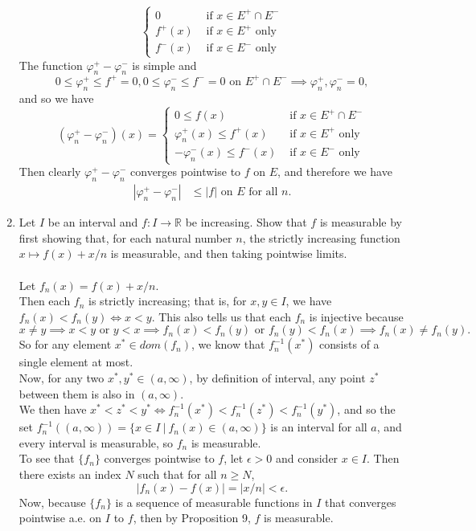 \begin{enumerate}
\[\begin{cases}
            0&\text{ if }x\in E^+\cap E^-\\
            f^+(x)&\text{ if }x\in E^+\text{ only}\\
            f^-(x)&\text{ if }x\in E^-\text{ only}
        \end{cases}    
    \]
    The function $\varphi^+_n-\varphi^-_n$ is simple and
    \[
        0\le\varphi^+_n\le f^+=0, 0\le\varphi^-_n\le f^-=0\text{ on }E^+\cap E^-\implies\varphi^+_n,\varphi^-_n =0,
    \]
    and so we have
    \[
        (\varphi^+_n-\varphi^-_n)(x)=
        \begin{cases}
            0\le f(x)&\text{ if }x\in E^+\cap E^-\\
            \varphi^+_n(x)\le f^+(x)&\text{ if }x\in E^+\text{ only}\\
            -\varphi^-_n(x)\le f^-(x)&\text{ if }x\in E^-\text{ only}
        \end{cases}    
    \]
    Then clearly $\varphi^+_n-\varphi^-_n$ converges pointwise to $f$ on $E$, and therefore we have
    \begin{align*}
        |\varphi^+_n-\varphi^-_n|&\le|f|\text{ on }E\text{ for all }n.
    \end{align*}
    \item Let $I$ be an interval and $f:I\to\mathbb{R}$ be increasing. Show that $f$ is measurable by first showing that, for each natural number $n$, the strictly increasing function $x\mapsto f(x)+x/n$ is measurable, and then taking pointwise limits.\\
    \\Let $f_n(x)=f(x)+x/n$.\\
    Then each $f_n$ is strictly increasing; that is, for $x,y\in I$, we have $f_n(x)<f_n(y)\iff x<y$. 
    This also tells us that each $f_n$ is injective because 
    \[
        x\neq y \implies x<y\text{ or }y<x \implies f_n(x)<f_n(y)\text{ or }f_n(y)<f_n(x)\implies f_n(x)\neq f_n(y).
    \]
    So for any element $x^*\in dom(f_n)$, we know that $f_n^{-1}(x^*)$ consists of a single element at most.
    \\Now, for any two $x^*,y^*\in(a,\infty)$, by definition of interval, any point $z^*$ between them is also in $(a,\infty)$. 
    \\We then have $x^*<z^*<y^* \iff f_n^{-1}(x^*)<f_n^{-1}(z^*)<f_n^{-1}(y^*)$, and so the set $f_n^{-1}((a,\infty))=\{x\in I\ |\ f_n(x)\in(a,\infty)\}$ is an interval for all $a$, and every interval is measurable, so $f_n$ is measurable.
    \\To see that $\{f_n\}$ converges pointwise to $f$, let $\epsilon>0$ and consider $x\in I$. 
    Then there exists an index $N$ such that for all $n\ge N$, 
    \[
        |f_n(x)-f(x)|=|x/n|<\epsilon.    
    \]
    Now, because $\{f_n\}$ is a sequence of measurable functions in $I$ that converges pointwise a.e. on $I$ to $f$, then by Proposition 9, $f$ is measurable.
\end{enumerate}


